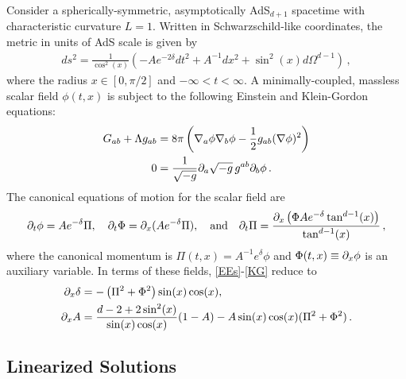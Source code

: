 \documentclass[../PhD.tex]{subfiles}
\begin{document}
Consider a spherically-symmetric, asymptotically AdS$_{d+1}$ spacetime with characteristic curvature $L=1$. Written in Schwarzschild-like coordinates, the metric in units of AdS scale is given by
\begin{align}
ds^2 = \frac{1}{\cos^2(x)} \left( -Ae^{-2\delta} dt^2 + A^{-1}dx^2 + \sin^2(x) d\Omega^{d-1}\right) \, ,
\end{align}
where the radius $x \in [0,\pi/2]$ and $-\infty < t < \infty$. A minimally-coupled, massless scalar field $\phi(t,x)$ is subject to the following Einstein and Klein-Gordon equations:
\begin{align}
\label{EEs}
G_{ab} + \Lambda g_{ab} &= 8\pi \left( \nabla_a \phi \nabla_b \phi - \frac{1}{2} g_{ab} (\nabla \phi)^2 \right) \\
\label{KG}
0 &= \frac{1}{\sqrt{-g}} \partial_a \sqrt{-g} \, g^{ab} \partial_b \phi \, .
\end{align}
The canonical equations of motion for the scalar field are
\begin{align}
\partial_t \phi = A e^{-\delta} \Pi, \quad \partial_t \Phi = \partial_x ( A e^{-\delta} \Pi), \quad \text{and} \quad \partial_t \Pi = \frac{\partial_x \left(\Phi A e^{-\delta} \tan^{d-1} (x) \right)}{\tan^{d-1}(x)} \, ,
\end{align}
where the canonical momentum is $\Pi(t,x) = A^{-1}e^\delta \phi$ and $\Phi(t,x) \equiv \partial_x \phi$ is an auxiliary variable. In terms of these fields, \eqref{EEs}-\eqref{KG} reduce to 
\begin{align}
	\label{EE const1}
	\partial_x \delta &= - \left( \Pi^2 + \Phi^2 \right) \sin(x) \cos(x), \\
	\label{EE const2}
	\partial_x A &= \frac{d - 2 + 2\sin^2(x)}{\sin (x)\cos(x)} (1 - A) - A \sin(x) \cos(x) (\Pi^2 + \Phi^2) \, .
\end{align}


\subsection{Linearized Solutions}
\end{document}
